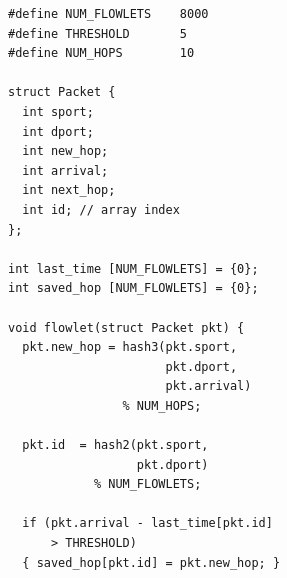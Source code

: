 \begin{figure}[!t]
\begin{minipage}{0.6\textwidth}
\begin{small}
\begin{lstlisting}[style=customc]
#define NUM_FLOWLETS    8000
#define THRESHOLD       5
#define NUM_HOPS        10

struct Packet {
  int sport;
  int dport;
  int new_hop;
  int arrival;
  int next_hop;
  int id; // array index
};

int last_time [NUM_FLOWLETS] = {0};
int saved_hop [NUM_FLOWLETS] = {0};

void flowlet(struct Packet pkt) {
  pkt.new_hop = hash3(pkt.sport,
                      pkt.dport,
                      pkt.arrival)
                % NUM_HOPS;

  pkt.id  = hash2(pkt.sport,
                  pkt.dport)
            % NUM_FLOWLETS;

  if (pkt.arrival - last_time[pkt.id]
      > THRESHOLD)
  { saved_hop[pkt.id] = pkt.new_hop; }


\end{lstlisting}
\end{small}
\end{minipage}
\end{figure}
